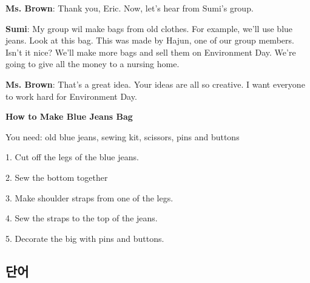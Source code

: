 \documentclass[9pt, a4paper]{oblivoir}
\begin{document}
        \noindent
        \textbf{Ms. Brown}: Thank you, Eric. Now, let's hear from Sumi's group.\newline

        \noindent
        \textbf{Sumi}: My group wil make bags from old clothes. For example, we'll use blue jeans. Look at this bag.
        This was made by Hajun, one of our group members. Isn't it nice? 
        We'll make more bags and sell them on Environment Day. We're going to give all the money to a nursing home.\newline

        \noindent
        \textbf{Ms. Brown}: That's a great idea. Your ideas are all so creative. I want everyone to work hard for Environment Day. \newline

        \noindent
        \textbf{How to Make Blue Jeans Bag}

        You need: old blue jeans, sewing kit, scissors, pins and buttons 
        
        1. Cut off the legs of the blue jeans. 

        2. Sew the bottom together

        3. Make shoulder straps from one of the legs. 

        4. Sew the straps to the top of the jeans. 

        5. Decorate the big with pins and buttons.
    \subsection*{단어}








        


    \newpage
\end{document}
